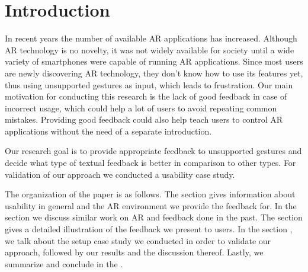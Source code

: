 \documentclass[11pt, a4paper]{article}
\begin{document}
	\section*{Introduction}\label{sec:introduction}
		In recent years the number of available \ac{AR} applications has increased.
		Although \ac{AR} technology is no novelty, it was not widely available for society until a wide variety of smartphones were capable of running \ac{AR} applications.
		Since most users are newly discovering \ac{AR} technology, they don't know how to use its features yet, thus using unsupported gestures as input, which leads to frustration.
		Our main motivation for conducting this research is the lack of good feedback in case of incorrect usage, which could help a lot of users to avoid repeating common mistakes.
		Providing good feedback could also help teach users to control \ac{AR} applications without the need of a separate introduction.

		Our research goal is to provide appropriate feedback to unsupported gestures and decide what type of textual feedback is better in comparison to other types. For validation of our approach we conducted a usability case study.

		The organization of the paper is as follows. The section  gives information about usability in general and the \ac{AR} environment we provide the feedback for. In the section  we discuss similar work on \ac{AR} and feedback done in the past.
		The  section gives a detailed illustration of the feedback we present to users. In the section , we talk about the setup case study we conducted in order to validate our approach, followed by our results and the discussion thereof. Lastly, we summarize and conclude in the . 
\end{document}
